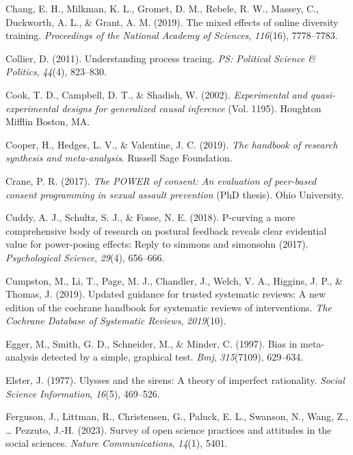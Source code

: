 \documentclass[
  man]{apa6}
\newlength{\cslhangindent}
\newenvironment{CSLReferences}[2] %
 {\begin{list}{}{%
  \setlength{\itemindent}{0pt}
  \setlength{\leftmargin}{0pt}
  \setlength{\parsep}{0pt}
  \ifodd #1
   \setlength{\leftmargin}{\cslhangindent}
   \setlength{\itemindent}{-1\cslhangindent}
  \fi
  \setlength{\itemsep}{#2\baselineskip}}}
 {\end{list}}
\begin{document}
\begin{CSLReferences}{1}{0}
Chang, E. H., Milkman, K. L., Gromet, D. M., Rebele, R. W., Massey, C., Duckworth, A. L., \& Grant, A. M. (2019). The mixed effects of online diversity training. \emph{Proceedings of the National Academy of Sciences}, \emph{116}(16), 7778--7783.

Collier, D. (2011). Understanding process tracing. \emph{PS: Political Science \& Politics}, \emph{44}(4), 823--830.

Cook, T. D., Campbell, D. T., \& Shadish, W. (2002). \emph{Experimental and quasi-experimental designs for generalized causal inference} (Vol. 1195). Houghton Mifflin Boston, MA.

Cooper, H., Hedges, L. V., \& Valentine, J. C. (2019). \emph{The handbook of research synthesis and meta-analysis}. Russell Sage Foundation.

Crane, P. R. (2017). \emph{The POWER of consent: An evaluation of peer-based consent programming in sexual assault prevention} (PhD thesis). Ohio University.

Cuddy, A. J., Schultz, S. J., \& Fosse, N. E. (2018). P-curving a more comprehensive body of research on postural feedback reveals clear evidential value for power-posing effects: Reply to simmons and simonsohn (2017). \emph{Psychological Science}, \emph{29}(4), 656--666.

Cumpston, M., Li, T., Page, M. J., Chandler, J., Welch, V. A., Higgins, J. P., \& Thomas, J. (2019). Updated guidance for trusted systematic reviews: A new edition of the cochrane handbook for systematic reviews of interventions. \emph{The Cochrane Database of Systematic Reviews}, \emph{2019}(10).

Egger, M., Smith, G. D., Schneider, M., \& Minder, C. (1997). Bias in meta-analysis detected by a simple, graphical test. \emph{Bmj}, \emph{315}(7109), 629--634.

Elster, J. (1977). Ulysses and the sirens: A theory of imperfect rationality. \emph{Social Science Information}, \emph{16}(5), 469--526.

Ferguson, J., Littman, R., Christensen, G., Paluck, E. L., Swanson, N., Wang, Z., \ldots{} Pezzuto, J.-H. (2023). Survey of open science practices and attitudes in the social sciences. \emph{Nature Communications}, \emph{14}(1), 5401.


\end{CSLReferences}
\end{document}
